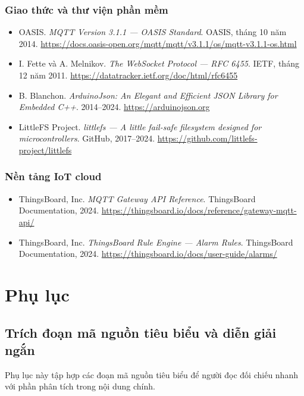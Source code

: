 \documentclass[12pt,a4paper]{report}
\begin{document}
\subsection*{Giao thức và thư viện phần mềm}
\begin{itemize}[leftmargin=1.5em]

\item OASIS. \textit{MQTT Version 3.1.1 --- OASIS Standard}. OASIS, tháng 10 năm 2014. \url{https://docs.oasis-open.org/mqtt/mqtt/v3.1.1/os/mqtt-v3.1.1-os.html}

\item I. Fette và A. Melnikov. \textit{The WebSocket Protocol --- RFC 6455}. IETF, tháng 12 năm 2011. \url{https://datatracker.ietf.org/doc/html/rfc6455}

\item B. Blanchon. \textit{ArduinoJson: An Elegant and Efficient JSON Library for Embedded C++}. 2014--2024. \url{https://arduinojson.org}

\item LittleFS Project. \textit{littlefs --- A little fail-safe filesystem designed for microcontrollers}. GitHub, 2017--2024. \url{https://github.com/littlefs-project/littlefs}

\end{itemize}

\subsection*{Nền tảng IoT cloud}
\begin{itemize}[leftmargin=1.5em]

\item ThingsBoard, Inc. \textit{MQTT Gateway API Reference}. ThingsBoard Documentation, 2024. \url{https://thingsboard.io/docs/reference/gateway-mqtt-api/}

\item ThingsBoard, Inc. \textit{ThingsBoard Rule Engine --- Alarm Rules}. ThingsBoard Documentation, 2024. \url{https://thingsboard.io/docs/user-guide/alarms/}

\end{itemize}

\appendix
\clearpage
\chapter*{Phụ lục}
\section*{Trích đoạn mã nguồn tiêu biểu và diễn giải ngắn}
Phụ lục này tập hợp các đoạn mã nguồn tiêu biểu để người đọc đối chiếu nhanh với phần phân tích trong nội dung chính.
\end{document}
